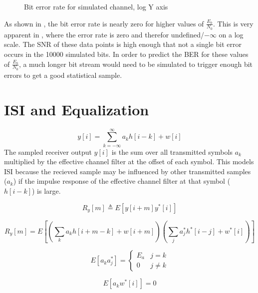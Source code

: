 \documentclass[11pt]{article}
\begin{document}
\begin{figure}[H]
    \centering
    \scalebox{0.7}{}
    \caption{Bit error rate for simulated channel, log Y axis\label{errorlog}}
\end{figure}

As shown in , the bit error rate is nearly zero for higher values of
$\frac{E_b}{N_0}$. This is very apparent in , where the error
rate is zero and therefor undefined/$-\infty$ on a log scale. The SNR of these
data points is high enough that not a single bit error occurs in the 10000
simulated bits. In order to predict the BER for these values of
$\frac{E_b}{N_0}$, a much longer bit stream would need to be simulated to
trigger enough bit errors to get a good statistical sample.

\section{ISI and Equalization}
\begin{equation}
    y[i] = \sum_{k=-\infty}^{\infty}  a_k h[i-k]+w[i]
\end{equation}
The sampled receiver output $y[i]$ is the sum over all transmitted symbols $a_k$
multiplied by the effective channel filter at the offset of each symbol. This
models ISI because the recieved sample may be influenced by other transmitted
samples ($a_k$) if the impulse response of the effective channel filter at that
symbol ($h[i-k]$) is large.

\begin{equation}
    R_y[m] \triangleq E\left[ y[i+m] y^*[i]\right]
\end{equation}

\begin{equation}
    R_y[m] = E \left[ \left( \sum_k a_k h[i+m-k]+w[i+m] \right) \left( \sum_j
        a_j^* h^*[i-j]+w^*[i] \right) \right]
\end{equation}

\begin{equation}
    E[a_k a_j^*] =
    \begin{cases}
        E_a & j=k      \\
        0   & j \neq k
    \end{cases}
\end{equation}

\begin{equation}
    E\left[a_k w^*[i]\right]= 0
\end{equation}
\end{document}
